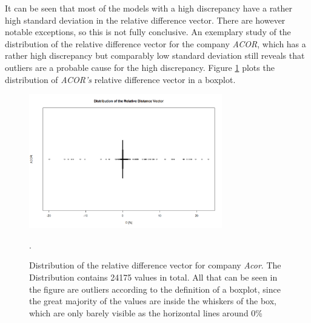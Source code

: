 It can be seen that most of the models with a high discrepancy have a rather high standard deviation in the relative difference vector. There are however notable exceptions, so this is not fully conclusive. An exemplary study of the distribution of the relative difference vector for the company \textit{ACOR}, which has a rather high discrepancy but comparably low standard deviation still reveals that outliers are a probable cause for the high discrepancy. Figure \ref{fig_acorDRDistribution} plots the distribution of \textit{ACOR's} relative difference vector in a boxplot.

\begin{figure}[h]
	\centering
  	\includegraphics[width=0.75\textwidth]{acorDRDistribution}
	\caption{Distribution of the relative difference vector for company \textit{Acor}. The Distribution contains 24175 values in total. All that can be seen in the figure are outliers according to the definition of a boxplot, since the great majority of the values are inside the whiskers of the box, which are only barely visible as the horizontal lines around 0\%}.
	\label{fig_acorDRDistribution}
\end{figure}


